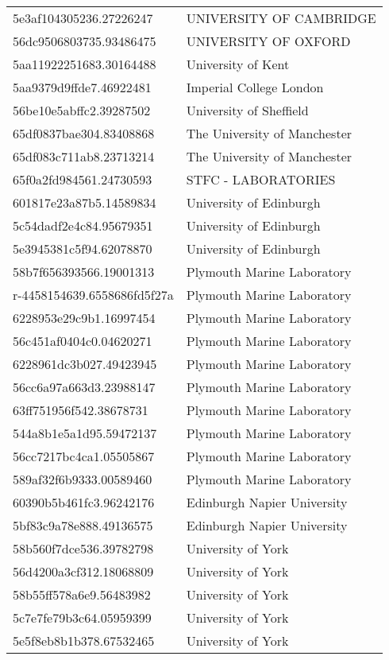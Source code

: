 \begin{tabular}{ll}
5e3af104305236.27226247 & UNIVERSITY OF CAMBRIDGE \\
56dc9506803735.93486475 & UNIVERSITY OF OXFORD \\
5aa11922251683.30164488 & University of Kent \\
5aa9379d9ffde7.46922481 & Imperial College London \\
56be10e5abffc2.39287502 & University of Sheffield \\
65df0837bae304.83408868 & The University of Manchester \\
65df083c711ab8.23713214 & The University of Manchester \\
65f0a2fd984561.24730593 & STFC - LABORATORIES \\
601817e23a87b5.14589834 & University of Edinburgh \\
5c54dadf2e4c84.95679351 & University of Edinburgh \\
5e3945381c5f94.62078870 & University of Edinburgh \\
58b7f656393566.19001313 & Plymouth Marine Laboratory \\
r-4458154639.6558686fd5f27a & Plymouth Marine Laboratory \\
6228953e29c9b1.16997454 & Plymouth Marine Laboratory \\
56c451af0404c0.04620271 & Plymouth Marine Laboratory \\
6228961dc3b027.49423945 & Plymouth Marine Laboratory \\
56cc6a97a663d3.23988147 & Plymouth Marine Laboratory \\
63ff751956f542.38678731 & Plymouth Marine Laboratory \\
544a8b1e5a1d95.59472137 & Plymouth Marine Laboratory \\
56cc7217bc4ca1.05505867 & Plymouth Marine Laboratory \\
589af32f6b9333.00589460 & Plymouth Marine Laboratory \\
60390b5b461fc3.96242176 & Edinburgh Napier University \\
5bf83c9a78e888.49136575 & Edinburgh Napier University \\
58b560f7dce536.39782798 & University of York \\
56d4200a3cf312.18068809 & University of York \\
58b55ff578a6e9.56483982 & University of York \\
5c7e7fe79b3c64.05959399 & University of York \\
5e5f8eb8b1b378.67532465 & University of York \\

\end{tabular}
